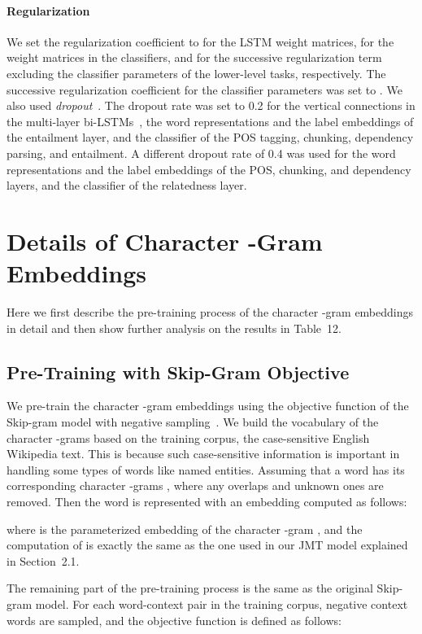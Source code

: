 \documentclass[11pt,a4paper]{article}
\begin{document}
\paragraph{Regularization}
We set the regularization coefficient to  for the LSTM weight matrices,  for the weight matrices in the classifiers, and  for the successive regularization term excluding the classifier parameters of the lower-level tasks, respectively.
The successive regularization coefficient for the classifier parameters was set to .
We also used {\it dropout}~\citep{dropout2014ver}.
The dropout rate was set to 0.2 for the vertical connections in the multi-layer bi-LSTMs~\citep{pham2015dropout}, the word representations and the label embeddings of the entailment layer, and the classifier of the POS tagging, chunking, dependency parsing, and entailment.
A different dropout rate of 0.4 was used for the word representations and the label embeddings of the POS, chunking, and dependency layers, and the classifier of the relatedness layer.

\section{Details of Character -Gram Embeddings}
\label{sec:char_detail}

Here we first describe the pre-training process of the character -gram embeddings in detail and then show further analysis on the results in Table~12.

\subsection{Pre-Training with Skip-Gram Objective}
We pre-train the character -gram embeddings using the objective function of the Skip-gram model with negative sampling~\citep{mikolov2013word2vec}.
We build the vocabulary of the character -grams based on the training corpus, the case-sensitive English Wikipedia text.
This is because such case-sensitive information is important in handling some types of words like named entities.
Assuming that a word  has its corresponding  character -grams , where any overlaps and unknown ones are removed.
Then the word  is represented with an embedding  computed as follows:

where  is the parameterized embedding of the character -gram , and the computation of  is exactly the same as the one used in our JMT model explained in Section~2.1.

The remaining part of the pre-training process is the same as the original Skip-gram model.
For each word-context pair  in the training corpus,  negative context words are sampled, and the objective function is defined as follows:
\end{document}
